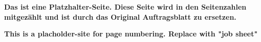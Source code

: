 \textbf{Das ist eine Platzhalter-Seite. Diese Seite wird in den Seitenzahlen mitgezählt und ist durch das Original \glqq{}Auftragsblatt\grqq{} zu ersetzen.}

\textbf{This is a placholder-site for page numbering. Replace with "job sheet"}
